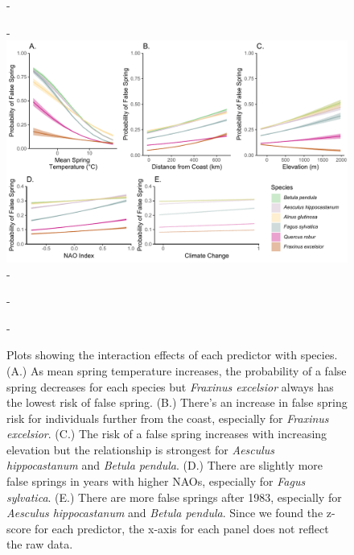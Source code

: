 \documentclass{article}\usepackage[]{graphicx}\usepackage[]{color}
\begin{document}
{\begin{figure} [H]
  -\begin{center}
  -\includegraphics[width=16cm]{..//analyses/figures/InteractionPlots/Species_orig.pdf}
  -\caption{Plots showing the interaction effects of each predictor with species. (A.) As mean spring temperature increases, the probability of a false spring decreases for each species but \textit{Fraxinus excelsior} always has the lowest risk of false spring. (B.) There's an increase in false spring risk for individuals further from the coast, especially for \textit{Fraxinus excelsior}. (C.) The risk of a false spring increases with increasing elevation but the relationship is strongest for \textit{Aesculus hippocastanum} and \textit{Betula pendula}. (D.) There are slightly more false springs in years with higher NAOs, especially for \textit{Fagus sylvatica}.  (E.) There are more false springs after 1983, especially for \textit{Aesculus hippocastanum} and \textit{Betula pendula}. Since we found the z-score for each predictor, the x-axis for each panel does not reflect the raw data.}\label{fig:spp}
  -\end{center}
  -\end{figure}}


  
\end{document}
